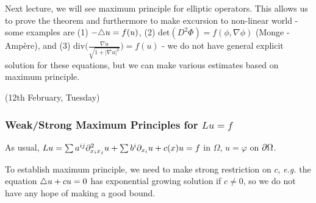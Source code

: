 \documentclass[12pt,a4paper]{article}
\begin{document}
Next lecture, we will see maximum principle for elliptic operators. This allows us to prove the theorem and furthermore to make excursion to non-linear world - some examples are (1) $-\triangle u = f(u)$, (2) $\text{det}(D^2 \Phi) = f(\phi, \nabla \phi)$ (Monge -Amp\`{e}re), and (3) $\text{div}\Big( \frac{\nabla u}{\sqrt{1+ |\nabla u|^2}} \Big) = f(u)$ - we do not have general explicit solution for these equations, but we can make various estimates based on maximum principle.
\s

\newday

(12th February, Tuesday)
\s

\subsubsection*{Weak/Strong Maximum Principles for $Lu =f$}

As usual, $Lu = \sum a^{ij}\partial^2_{x_i x_j} u + \sum b^i \partial_{x_i} u + c(x) u = f$ in $\Omega$, $u=\varphi$ on $\partial \Omega$.
\s

To establish maximum principle, we need to make strong restriction on $c$, \textit{e.g.} the equation $\triangle u + cu =0$ has exponential growing solution if $c\neq 0$, so we do not have any hope of making a good bound. 
\s
\end{document}
